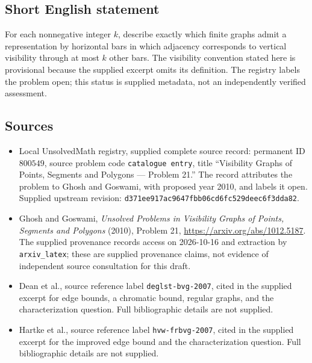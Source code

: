 \documentclass[11pt]{article}
\begin{document}
\subsection{Short English statement}
For each nonnegative integer $k$, describe exactly which finite graphs admit a representation by horizontal bars in which adjacency corresponds to vertical visibility through at most $k$ other bars. The visibility convention stated here is provisional because the supplied excerpt omits its definition. The registry labels the problem open; this status is supplied metadata, not an independently verified assessment.
\subsection{Sources}
\begin{itemize}
\item Local UnsolvedMath registry, supplied complete source record: permanent ID $800549$, source problem code \texttt{catalogue entry}, title ``Visibility Graphs of Points, Segments and Polygons --- Problem 21.'' The record attributes the problem to Ghosh and Goswami, with proposed year 2010, and labels it open. Supplied upstream revision: \texttt{d371ee917ac9647fbb06cd6fc529deec6f3dda82}.
\item Ghosh and Goswami, \emph{Unsolved Problems in Visibility Graphs of Points, Segments and Polygons} (2010), Problem 21, \url{https://arxiv.org/abs/1012.5187}. The supplied provenance records access on 2026-10-16 and extraction by \texttt{arxiv\_latex}; these are supplied provenance claims, not evidence of independent source consultation for this draft.
\item Dean et al., source reference label \texttt{deglst-bvg-2007}, cited in the supplied excerpt for edge bounds, a chromatic bound, regular graphs, and the characterization question. Full bibliographic details are not supplied.
\item Hartke et al., source reference label \texttt{hvw-frbvg-2007}, cited in the supplied excerpt for the improved edge bound and the characterization question. Full bibliographic details are not supplied.
\end{itemize}
\end{document}
